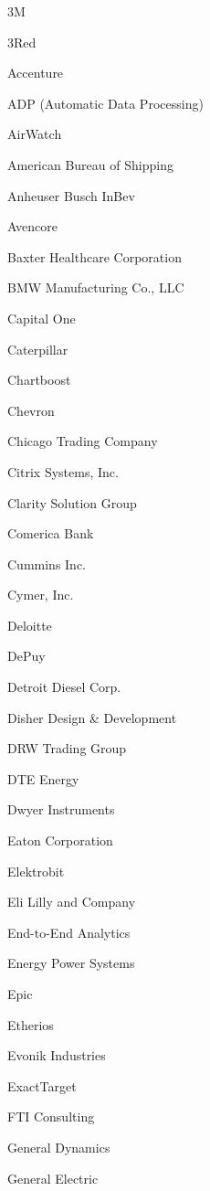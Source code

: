 \documentclass[twoside]{article}
\begin{document}
\begin{center}
\begin{multicols}{5}
        \vspace{-.9em}
        \begin{FlushLeft}
        \begin{compactitem}
        \item 3M
\item 3Red
\item Accenture
\item ADP (Automatic Data Processing)
\item AirWatch
\item American Bureau of Shipping
\item Anheuser Busch InBev
\item Avencore
\item Baxter Healthcare Corporation
\item BMW Manufacturing Co., LLC
\item Capital One
\item Caterpillar
\item Chartboost
\item Chevron
\item Chicago Trading Company
\item Citrix Systems, Inc.
\item Clarity Solution Group
\item Comerica Bank
\item Cummins Inc.
\item Cymer, Inc.
\item Deloitte
\item DePuy
\item Detroit Diesel Corp.
\item Disher Design \& Development
\item DRW Trading Group
\item DTE Energy
\item Dwyer Instruments
\item Eaton Corporation
\item Elektrobit
\item Eli Lilly and Company
\item End-to-End Analytics
\item Energy Power Systems
\item Epic
\item Etherios
\item Evonik Industries
\item ExactTarget
\item FTI Consulting
\item General Dynamics
\item General Electric

\end{compactitem}
\end{FlushLeft}
\end{multicols}
\end{center}
\end{document}
